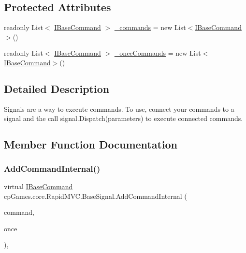 \subsection*{Protected Attributes}
\begin{DoxyCompactItemize}
\item 
readonly List$<$ \mbox{\hyperlink{interfacecp_games_1_1core_1_1_rapid_m_v_c_1_1_i_base_command}{I\+Base\+Command}} $>$ \mbox{\hyperlink{classcp_games_1_1core_1_1_rapid_m_v_c_1_1_base_signal_ad29b324b141365d15882e0b6e35b8af6}{\+\_\+commands}} = new List$<$\mbox{\hyperlink{interfacecp_games_1_1core_1_1_rapid_m_v_c_1_1_i_base_command}{I\+Base\+Command}}$>$()
\item 
readonly List$<$ \mbox{\hyperlink{interfacecp_games_1_1core_1_1_rapid_m_v_c_1_1_i_base_command}{I\+Base\+Command}} $>$ \mbox{\hyperlink{classcp_games_1_1core_1_1_rapid_m_v_c_1_1_base_signal_a952e859b0a6e3623fffc16d323a75dd4}{\+\_\+once\+Commands}} = new List$<$\mbox{\hyperlink{interfacecp_games_1_1core_1_1_rapid_m_v_c_1_1_i_base_command}{I\+Base\+Command}}$>$()
\end{DoxyCompactItemize}


\subsection{Detailed Description}
Signals are a way to execute commands. To use, connect your commands to a signal and the call signal.\+Dispatch(parameters) to execute connected commands. 



\subsection{Member Function Documentation}
\mbox{\label{classcp_games_1_1core_1_1_rapid_m_v_c_1_1_base_signal_ab3899ea2a251c554f2b7ec3e6f4a9ed3}} 
\subsubsection{\texorpdfstring{AddCommandInternal()}{AddCommandInternal()}}
{\footnotesize\ttfamily virtual \mbox{\hyperlink{interfacecp_games_1_1core_1_1_rapid_m_v_c_1_1_i_base_command}{I\+Base\+Command}} cp\+Games.\+core.\+Rapid\+M\+V\+C.\+Base\+Signal.\+Add\+Command\+Internal (\begin{DoxyParamCaption}\item[{\mbox{\hyperlink{interfacecp_games_1_1core_1_1_rapid_m_v_c_1_1_i_base_command}{I\+Base\+Command}}}]{command,  }\item[{bool}]{once }\end{DoxyParamCaption})\hspace{0.3cm}{\ttfamily [protected]}, {\ttfamily [virtual]}}

